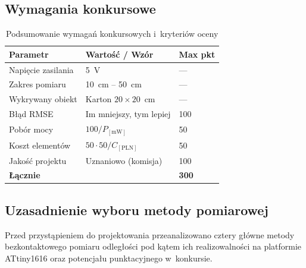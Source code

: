 \documentclass[a4paper,11pt]{article}
\begin{document}
\subsection{Wymagania konkursowe}

\begin{table}[H]
    \centering
    \caption{Podsumowanie wymagań konkursowych i~kryteriów oceny}
    \label{tab:wymagania}
    \begin{tabular}{lll}
        \toprule
        \textbf{Parametr}       & \textbf{Wartość / Wzór} & \textbf{Max pkt} \\
        \midrule
        Napięcie zasilania      & \SI{5}{\volt}  & --- \\
        Zakres pomiaru          & \SI{10}{\centi\metre} -- \SI{50}{\centi\metre} & --- \\
        Wykrywany obiekt        & Karton $20 \times 20$~\si{\centi\metre} & --- \\
        Błąd RMSE               & Im mniejszy, tym lepiej & 100 \\
        Pobór mocy              & $100 / P_{[\si{\milli\watt}]}$ & 50 \\
        Koszt elementów         & $50 \cdot 50 / C_{[\text{PLN}]}$ & 50 \\
        Jakość projektu         & Uznaniowo (komisja) & 100 \\
        \midrule
        \textbf{Łącznie}        & & \textbf{300} \\
        \bottomrule
    \end{tabular}
\end{table}

\subsection{Uzasadnienie wyboru metody pomiarowej}

Przed przystąpieniem do projektowania przeanalizowano cztery główne metody
bezkontaktowego pomiaru odległości pod kątem ich realizowalności na platformie
ATtiny1616 oraz potencjału punktacyjnego w~konkursie.
\end{document}
